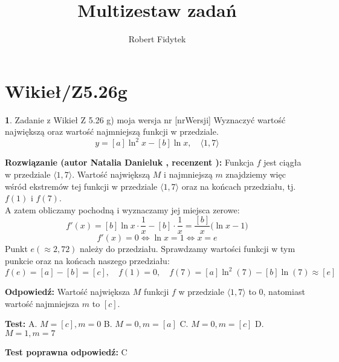 \documentclass[12pt, a4paper]{article}
\title{Multizestaw zadań}
\author{Robert Fidytek}
\date{}
\theoremstyle{definition} %
\newtheorem{zad}{}
\newcommand{\kategoria}[1]{\section{#1}} %
\newcommand{\zadStart}[1]{\begin{zad}#1\newline} %
\newcommand{\zadStop}{\end{zad}}   %
\newcommand{\rozwStart}[2]{\noindent \textbf{Rozwiązanie (autor #1 , recenzent #2): }\newline} %
\newcommand{\rozwStop}{\newline}                                            %
\newcommand{\odpStart}{\noindent \textbf{Odpowiedź:}\newline}    %
\newcommand{\odpStop}{\newline}                                             %
\newcommand{\testStart}{\noindent \textbf{Test:}\newline} %
\newcommand{\testStop}{\newline} %
\newcommand{\kluczStart}{\noindent \textbf{Test poprawna odpowiedź:}\newline} %
\newcommand{\kluczStop}{\newline} %
\begin{document}
\maketitle

\kategoria{Wikieł/Z5.26g}

\zadStart{Zadanie z Wikieł Z 5.26 g) moja wersja nr [nrWersji]}
Wyznaczyć wartość największą oraz wartość najmniejszą funkcji w przedziale. 
$$y = [a]\ln^2 x - [b]\ln x, \quad \langle1,7\rangle$$
\zadStop

\rozwStart{Natalia Danieluk}{}
Funkcja $f$ jest ciągła w przedziale $\langle1,7\rangle$. Wartość największą $M$ i najmniejszą $m$ znajdziemy więc wśród ekstremów tej funkcji w przedziale $\langle1,7\rangle$ oraz na końcach przedziału, tj. $f(1)$ i $f(7)$. \\
A zatem obliczamy pochodną i wyznaczamy jej miejsca zerowe:
$$ f'(x) = [b]\ln x \cdot \frac{1}{x} - [b]\cdot \frac{1}{x} = \frac{[b]}{x} \big (\ln x - 1 \big ) $$
$$ f'(x) = 0 \Leftrightarrow \ln x = 1 \Leftrightarrow x = e $$ 
Punkt $e (\approx 2,72)$ należy do przedziału. Sprawdzamy wartości funkcji w tym punkcie oraz na końcach naszego przedziału: \\
$$ f(e) = [a]-[b]=[c],\quad f(1) = 0,\quad f(7) = [a]\ln^2 (7) - [b]\ln (7) \approx [e] $$
\rozwStop

\odpStart
Wartość największa $M$ funkcji $f$ w przedziale $\langle1,7\rangle$ to $0$, natomiast wartość najmniejsza $m$ to $[c]$.
\odpStop

\testStart
A. $M=[c], m=0$
B. $M=0, m=[a]$
C. $M=0, m=[c]$
D. $M=1, m=7$
\testStop

\kluczStart
C
\kluczStop
\end{document}
